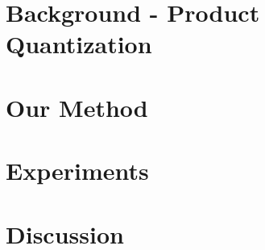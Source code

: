 \documentclass{article}  %
\begin{document}

% 

\vspace{-1.5mm}
\section{Background - Product Quantization} \label{sec:background}
\vspace{-.5mm}



\vspace{-3mm}
\section{Our Method} \label{sec:method}
\vspace{-.5mm}



\section{Experiments} \label{sec:results}



\section{Discussion} \label{sec:limitations}



\end{document}
